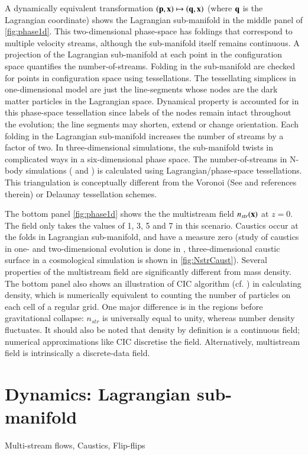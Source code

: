  
A dynamically equivalent transformation $(\bf{p}, \bf{x}) \mapsto (\bf{q}, \bf{x}) $ (where $\bf{q}$ is the Lagrangian coordinate) shows the Lagrangian sub-manifold in the middle panel of \autoref{fig:phase1d}. This two-dimensional phase-space has foldings that correspond to multiple velocity streams, although the sub-manifold itself remains continuous. A projection of the Lagrangian sub-manifold at each point in the configuration space quantifies the number-of-streams. Folding in the sub-manifold are checked for points in configuration space using tessellations. The tessellating simplices in one-dimensional model are just the line-segments whose nodes are the dark matter particles in the Lagrangian space. Dynamical property is accounted for in this phase-space tessellation since labels of the nodes remain intact throughout the evolution; the line segments may shorten, extend or change orientation. Each folding in the Lagrangian sub-manifold increases the number of streams by a factor of two. In three-dimensional simulations, the sub-manifold twists in complicated ways in a six-dimensional phase space. The number-of-streams in N-body simulations (\citealt{Shandarin2012} and \citealt{Abel2012}) is calculated using Lagrangian/phase-space tessellations. This triangulation is conceptually different from the Voronoi (See \citealt{Schaap2000} and references therein) or Delaunay \citep{Icke1991} tessellation schemes. 

The bottom panel \autoref{fig:phase1d} shows the the multistream field $n_{str}(\bf{x})$ at $z = 0$. The field only takes the values of 1, 3, 5 and 7 in this scenario. Caustics occur at the folds in Lagrangian sub-manifold, and have a measure zero (study of caustics in one- and  two-dimensional evolution is done in \cite{Hidding2014}, three-dimensional caustic surface in a cosmological simulation is shown in \autoref{fig:NstrCaust}). Several properties of the multistream field are significantly different from mass density. The bottom panel also shows an illustration of CIC algorithm (cf. \citealt{Hockney1988}) in calculating density, which is numerically equivalent to counting the number of particles on each cell of a regular grid. One major difference is in the regions before gravitational collapse: $n_{str}$ is universally equal to unity, whereas number density fluctuates. It should also be noted that density by definition is a continuous field; numerical approximations like CIC discretise the field. Alternatively, multistream field is intrinsically a discrete-data field.  



\section{Dynamics: Lagrangian sub-manifold}
Multi-stream flows, Caustics, Flip-flips